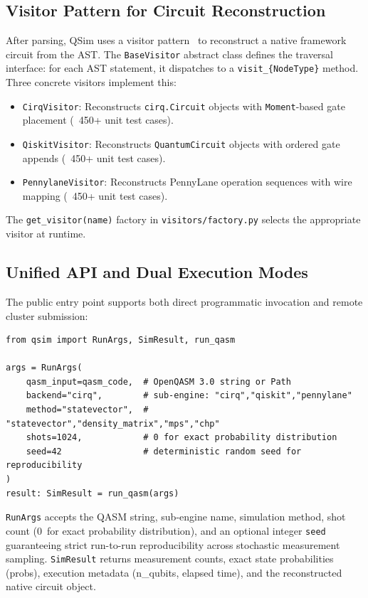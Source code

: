 \documentclass[runningheads]{llncs}
\begin{document}
\subsection{Visitor Pattern for Circuit Reconstruction}

After parsing, QSim uses a visitor pattern~\cite{gamma1994} to reconstruct a native framework circuit from the AST. The \texttt{BaseVisitor} abstract class defines the traversal interface: for each AST statement, it dispatches to a \texttt{visit\_\{NodeType\}} method. Three concrete visitors implement this:
\begin{itemize}
    \item \texttt{CirqVisitor}: Reconstructs \texttt{cirq.Circuit} objects with \texttt{Moment}-based gate placement (~450+ unit test cases).
    \item \texttt{QiskitVisitor}: Reconstructs \texttt{QuantumCircuit} objects with ordered gate appends (~450+ unit test cases).
    \item \texttt{PennylaneVisitor}: Reconstructs PennyLane operation sequences with wire mapping (~450+ unit test cases).
\end{itemize}
The \texttt{get\_visitor(name)} factory in \texttt{visitors/factory.py} selects the appropriate visitor at runtime.

\subsection{Unified API and Dual Execution Modes}

The public entry point supports both direct programmatic invocation and remote cluster submission:
\begin{lstlisting}
from qsim import RunArgs, SimResult, run_qasm

args = RunArgs(
    qasm_input=qasm_code,  # OpenQASM 3.0 string or Path
    backend="cirq",        # sub-engine: "cirq","qiskit","pennylane"
    method="statevector",  # "statevector","density_matrix","mps","chp"
    shots=1024,            # 0 for exact probability distribution
    seed=42                # deterministic random seed for reproducibility
)
result: SimResult = run_qasm(args)
\end{lstlisting}

\texttt{RunArgs} accepts the QASM string, sub-engine name, simulation method, shot count (0~for exact probability distribution), and an optional integer \texttt{seed} guaranteeing strict run-to-run reproducibility across stochastic measurement sampling. \texttt{SimResult} returns measurement counts, exact state probabilities (probs), execution metadata (n\_qubits, elapsed time), and the reconstructed native circuit object.
\end{document}
